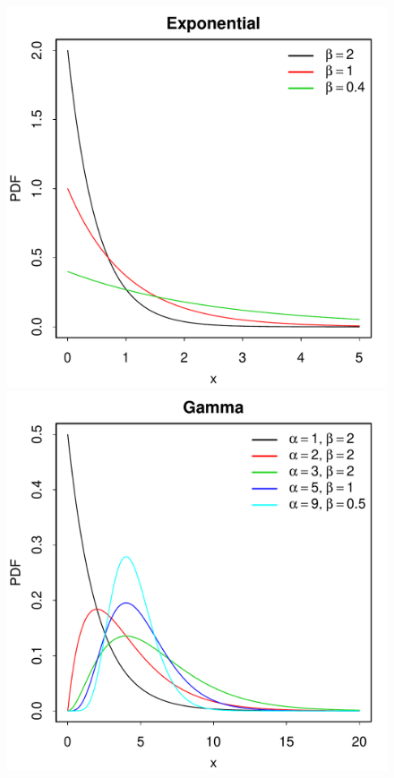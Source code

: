 \documentclass[landscape]{article}
\begin{document}
\begin{figure}[H]
  \includegraphics[scale=0.35]{figs/exponential.pdf}
  \includegraphics[scale=0.35]{figs/gamma.pdf}

\end{figure}
\end{document}
